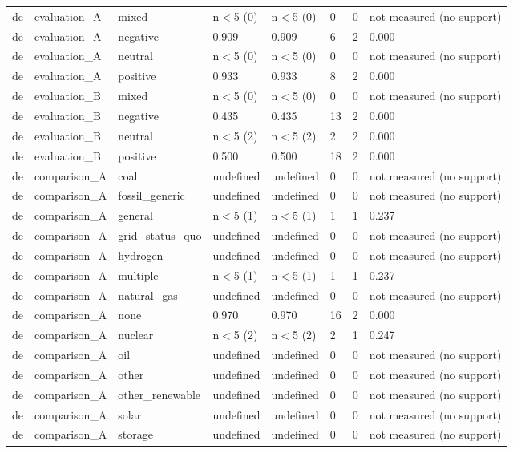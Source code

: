 \begin{table}[htbp]
\begin{tabular}{llllllll}
de & evaluation\_A & mixed & n$<$5 (0) & n$<$5 (0) & 0 & 0 & not measured (no support) \\
de & evaluation\_A & negative & 0.909 & 0.909 & 6 & 2 & 0.000 \\
de & evaluation\_A & neutral & n$<$5 (0) & n$<$5 (0) & 0 & 0 & not measured (no support) \\
de & evaluation\_A & positive & 0.933 & 0.933 & 8 & 2 & 0.000 \\
de & evaluation\_B & mixed & n$<$5 (0) & n$<$5 (0) & 0 & 0 & not measured (no support) \\
de & evaluation\_B & negative & 0.435 & 0.435 & 13 & 2 & 0.000 \\
de & evaluation\_B & neutral & n$<$5 (2) & n$<$5 (2) & 2 & 2 & 0.000 \\
de & evaluation\_B & positive & 0.500 & 0.500 & 18 & 2 & 0.000 \\
de & comparison\_A & coal & undefined & undefined & 0 & 0 & not measured (no support) \\
de & comparison\_A & fossil\_generic & undefined & undefined & 0 & 0 & not measured (no support) \\
de & comparison\_A & general & n$<$5 (1) & n$<$5 (1) & 1 & 1 & 0.237 \\
de & comparison\_A & grid\_status\_quo & undefined & undefined & 0 & 0 & not measured (no support) \\
de & comparison\_A & hydrogen & undefined & undefined & 0 & 0 & not measured (no support) \\
de & comparison\_A & multiple & n$<$5 (1) & n$<$5 (1) & 1 & 1 & 0.237 \\
de & comparison\_A & natural\_gas & undefined & undefined & 0 & 0 & not measured (no support) \\
de & comparison\_A & none & 0.970 & 0.970 & 16 & 2 & 0.000 \\
de & comparison\_A & nuclear & n$<$5 (2) & n$<$5 (2) & 2 & 1 & 0.247 \\
de & comparison\_A & oil & undefined & undefined & 0 & 0 & not measured (no support) \\
de & comparison\_A & other & undefined & undefined & 0 & 0 & not measured (no support) \\
de & comparison\_A & other\_renewable & undefined & undefined & 0 & 0 & not measured (no support) \\
de & comparison\_A & solar & undefined & undefined & 0 & 0 & not measured (no support) \\
de & comparison\_A & storage & undefined & undefined & 0 & 0 & not measured (no support) \\

\end{tabular}
\end{table}
